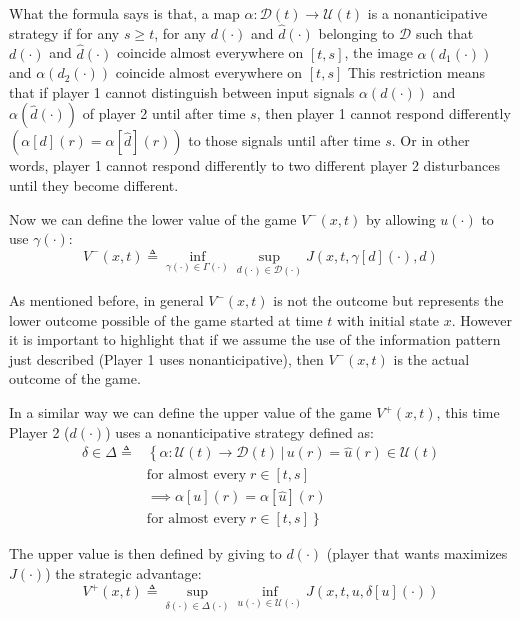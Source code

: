 What the formula says is that, a map $\alpha : \mathcal{D}(t) \rightarrow \mathcal{U}(t)$ is a nonanticipative strategy if for any $s \geq t$, for any $d(\cdot)$ and $\hat{d}(\cdot)$ belonging to $\mathcal{D}$ such that $d(\cdot)$ and $\hat{d}(\cdot)$ coincide almost everywhere on $[t,s]$, the image $\alpha(d_1(\cdot))$ and $\alpha(d_2(\cdot))$ coincide almost everywhere on $[t,s]$ This restriction means that if player 1 cannot distinguish between input signals $ \alpha (d( \cdot )) $ and $ \alpha (\hat{d}( \cdot ) )$ of player 2 until after time $s$, then player 1 cannot respond differently $( \alpha [d](r) = \alpha [\hat{d}](r))$ to those signals until after time $s$. Or in other words, player 1 cannot respond differently to two different player 2 disturbances until they become different.

Now we can define the lower value of the game $V^-(x,t)$ by allowing $u(\cdot)$ to use $\gamma(\cdot)$:
\begin{equation}
	\label{lower_value_game}
	V^-(x,t) \triangleq \inf_{\gamma(\cdot) \in \Gamma(\cdot)}\sup_{d(\cdot) \in \mathcal{D}(\cdot)}J(x,t, \gamma[d](\cdot), d)
\end{equation}

As mentioned before, in general $V^-(x,t)$ is not the outcome but represents the lower outcome possible of the game started at time $t$ with initial state $x$. However it is important to highlight that if we assume the use of the information pattern just described (Player 1 uses nonanticipative), then $V^-(x,t)$ is the actual outcome of the game.

In a similar way we can define the upper value of the game $V^+(x,t)$, this time Player 2 ($d(\cdot)$) uses a nonanticipative strategy defined as:
\begin{equation}
	\label{eq:non_ant_stra_d}
	\begin{split}
		\delta \in \Delta \triangleq 
		& \left\{ 
			\alpha : \mathcal{U}(t) \rightarrow \mathcal{D}(t)\,|\,u(r) = \hat{u}(r) \in \mathcal{U}(t)
		\right. \\ 
		& \textrm{for almost every} \;r \in [t,s] \\
		& \implies \alpha[u](r)= \alpha[\hat{u}](r) \\
		& \left. 
			\textrm{for almost every} \; r \in [t,s] 
		\right\}  
	\end{split}
\end{equation}

The upper value is then defined by giving to $d(\cdot)$ (player that wants maximizes $J(\cdot)$) the strategic advantage:
\begin{equation}
	\label{upper_value_game}
	V^+(x,t) \triangleq \sup_{\delta(\cdot) \in \Delta(\cdot)}\inf_{u(\cdot) \in \mathcal{U}(\cdot)} J(x,t, u, \delta[u](\cdot))
\end{equation}

